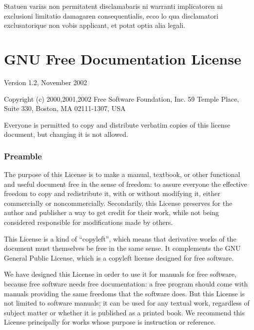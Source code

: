 Statuen varias non permitatent disclamabaris ni warranti implicatoren
ni exclusioni limitatio damagaren consequentialis, ecco lo qua disclamatori
exclusato\-rique non vobis applicant, et potat optia alia legali.

\twocolumn

\chapter{GNU Free Documentation License\label{sec:GFDL} }

{\scriptsize{}Version 1.2, November 2002}{\scriptsize\par}

{\tiny{}Copyright (c) 2000,2001,2002 Free Software Foundation, Inc.
59 Temple Place, Suite 330, Boston, MA 02111-1307, USA}{\tiny\par}

{\tiny{}Everyone is permitted to copy and distribute verbatim copies
of this license document, but changing it is not allowed.}{\tiny\par}

{\tiny{}\setcounter{subsection}{-1}}{\tiny\par}

\subsection*{{\tiny{}Preamble}}

{\tiny{}The purpose of this License is to make a manual, textbook,
or other functional and useful document free in the sense of freedom:
to assure everyone the effective freedom to copy and redistribute
it, with or without modifying it, either commercially or noncommercially.
Secondarily, this License preserves for the author and publisher a
way to get credit for their work, while not being considered responsible
for modifications made by others.}{\tiny\par}

{\tiny{}This License is a kind of \textquotedblleft copyleft\textsf{''}, which
means that derivative works of the document must themselves be free
in the same sense. It complements the GNU General Public License,
which is a copyleft license designed for free software.}{\tiny\par}

{\tiny{}We have designed this License in order to use it for manuals
for free software, because free software needs free documentation:
a free program should come with manuals providing the same freedoms
that the software does. But this License is not limited to software
manuals; it can be used for any textual work, regardless of subject
matter or whether it is published as a printed book. We recommend
this License principally for works whose purpose is instruction or
reference.}{\tiny\par}

